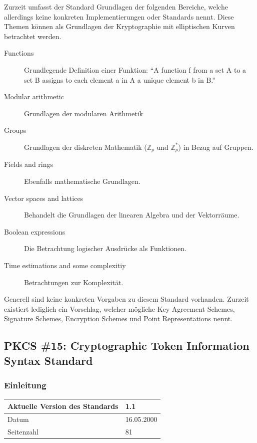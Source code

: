 \documentclass[10pt,a4paper]{article}
\begin{document}
Zurzeit umfasst der Standard Grundlagen der folgenden Bereiche, welche allerdings keine
konkreten Implementierungen oder Standards nennt. Diese Themen können als Grundlagen der
Kryptographie mit elliptischen Kurven betrachtet werden.

\begin{description}
    \item[Functions] Grundlegende Definition einer Funktion: "`A function f from a set A
        to a set B assigns to each element a in A a unique element b in
        B."'~\cite{pkcs13-func}
    \item[Modular arithmetic] Grundlagen der modularen Arithmetik
    \item[Groups] Grundlagen der diskreten Mathematik ($\mathbb{Z}_p$ und
        $\mathbb{Z}_p^*$) in Bezug auf Gruppen.
    \item[Fields and rings] Ebenfalls mathematische Grundlagen.
    \item[Vector spaces and lattices] Behandelt die Grundlagen der linearen Algebra und
        der Vektorräume.
    \item[Boolean expressions] Die Betrachtung logischer Ausdrücke als Funktionen.
    \item[Time estimations and some complexitiy] Betrachtungen zur Komplexität.
\end{description}

Generell sind keine konkreten Vorgaben zu diesem Standard vorhanden. Zurzeit existiert
lediglich ein Vorschlag, welcher mögliche Key Agreement Schemes, Signature Schemes,
Encryption Schemes und Point Representations nennt.

\subsection{PKCS \#15: Cryptographic Token Information Syntax Standard}

\subsubsection{Einleitung}
\begin{table}[ht]
    \centering
    \begin{tabular}{|l|l|} \hline
        Aktuelle Version des Standards & 1.1 \\\hline
        Datum & 16.05.2000 \\\hline
        Seitenzahl & 81 \\\hline
    \end{tabular}
\end{table}
\end{document}
